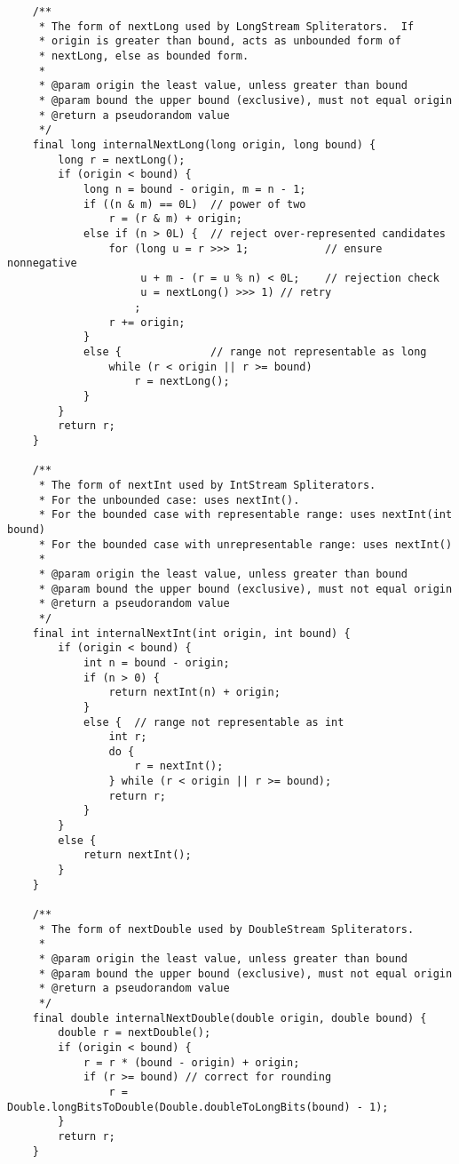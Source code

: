 \documentclass[12pt,a4paper,twoside,openright,titlepage,final]{article}
\begin{document}
\begin{verbatim}
    /**
     * The form of nextLong used by LongStream Spliterators.  If
     * origin is greater than bound, acts as unbounded form of
     * nextLong, else as bounded form.
     *
     * @param origin the least value, unless greater than bound
     * @param bound the upper bound (exclusive), must not equal origin
     * @return a pseudorandom value
     */
    final long internalNextLong(long origin, long bound) {
        long r = nextLong();
        if (origin < bound) {
            long n = bound - origin, m = n - 1;
            if ((n & m) == 0L)  // power of two
                r = (r & m) + origin;
            else if (n > 0L) {  // reject over-represented candidates
                for (long u = r >>> 1;            // ensure nonnegative
                     u + m - (r = u % n) < 0L;    // rejection check
                     u = nextLong() >>> 1) // retry
                    ;
                r += origin;
            }
            else {              // range not representable as long
                while (r < origin || r >= bound)
                    r = nextLong();
            }
        }
        return r;
    }

    /**
     * The form of nextInt used by IntStream Spliterators.
     * For the unbounded case: uses nextInt().
     * For the bounded case with representable range: uses nextInt(int bound)
     * For the bounded case with unrepresentable range: uses nextInt()
     *
     * @param origin the least value, unless greater than bound
     * @param bound the upper bound (exclusive), must not equal origin
     * @return a pseudorandom value
     */
    final int internalNextInt(int origin, int bound) {
        if (origin < bound) {
            int n = bound - origin;
            if (n > 0) {
                return nextInt(n) + origin;
            }
            else {  // range not representable as int
                int r;
                do {
                    r = nextInt();
                } while (r < origin || r >= bound);
                return r;
            }
        }
        else {
            return nextInt();
        }
    }

    /**
     * The form of nextDouble used by DoubleStream Spliterators.
     *
     * @param origin the least value, unless greater than bound
     * @param bound the upper bound (exclusive), must not equal origin
     * @return a pseudorandom value
     */
    final double internalNextDouble(double origin, double bound) {
        double r = nextDouble();
        if (origin < bound) {
            r = r * (bound - origin) + origin;
            if (r >= bound) // correct for rounding
                r = Double.longBitsToDouble(Double.doubleToLongBits(bound) - 1);
        }
        return r;
    }


\end{verbatim}
\end{document}
